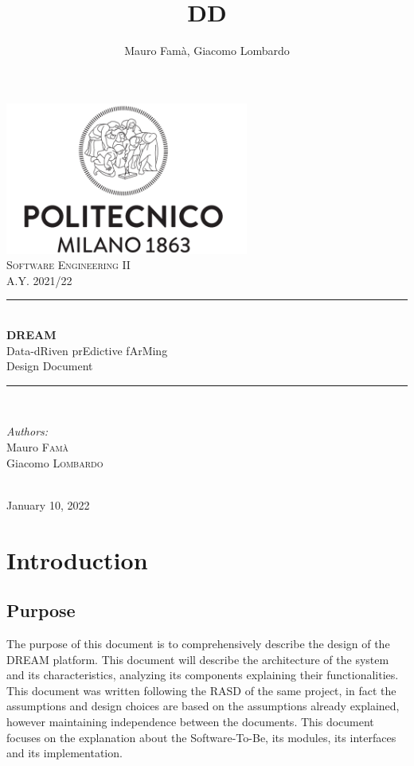\documentclass[10pt]{article} %
\title{DD}
\author{Mauro Famà, Giacomo Lombardo}
\begin{document}
\thispagestyle{empty}
\begin{titlepage}
    \newcommand{\HRule}{\rule{\linewidth}{0.5mm}}
    \center
    \includegraphics[width=8cm]{polimi.png}\\[1cm]

    \textsc{\Large Software Engineering II}\\[0.5cm]
    \textsc{\large A.Y. 2021/22}\\[0.5cm]

    \HRule \\[0.4cm]
        { \Huge \bfseries DREAM}\\[0.2cm]
        { \large Data-dRiven prEdictive fArMing}\\[0.4cm]
        { \LARGE Design Document}
    \HRule \\[1.5cm]

    \begin{minipage}{0.4\textwidth}
        \begin{flushleft} \large
        \emph{Authors:}\\
        Mauro \textsc{Famà}\\
        Giacomo \textsc{Lombardo}\\
        \end{flushleft}
    \end{minipage}\\[2cm]

    {\large January 10, 2022}\\[2cm]
    
    \vfill
\end{titlepage}
\newpage
\tableofcontents %
\newpage
\section{Introduction}
\subsection{Purpose}
The purpose of this document is to comprehensively describe the design of the DREAM platform. %
This document will describe the architecture of the system and its characteristics, 
analyzing its components explaining their functionalities.\\
This document was written following the RASD of the same project, 
in fact the assumptions and design choices are based on the assumptions already explained, 
however maintaining independence between the documents. This document focuses on the explanation 
about the Software-To-Be, its modules, its interfaces and its implementation.
\end{document}
